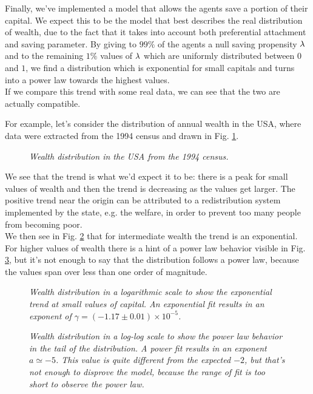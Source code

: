 Finally, we've implemented a model that allows the agents save a portion of their capital.
We expect this to be the model that best describes the real distribution of wealth, due to the fact that it takes into account both preferential attachment and saving parameter.
By giving to $99 \%$ of the agents a null saving propensity $\lambda$ and to the remaining $1 \%$ values of $\lambda$ which are uniformly distributed between $0$ and $1$, we find a distribution which is exponential for small capitals and turns into a power law towards the highest values. \\
If we compare this trend with some real data, we can see that the two are actually compatible.

For example, let's consider the distribution of annual wealth in the USA, where data were extracted from the 1994 census and drawn in Fig. \ref{fig:gloabl_realData}.
\begin{figure}[H]
    \centering
    \scalebox{.7}{}
    \caption{\emph{Wealth distribution in the USA from the 1994 census.}}
    \label{fig:gloabl_realData}
\end{figure}
We see that the trend is what we'd expect it to be: there is a peak for small values of wealth and then the trend is decreasing as the values get larger.
The positive trend near the origin can be attributed to a redistribution system implemented by the state, e.g. the welfare, in order to prevent too many people from becoming poor. \\
We then see in Fig. \ref{fig:real_head} that for intermediate wealth the trend is an exponential.
For higher values of wealth there is a hint of a power law behavior visible in Fig. \ref{fig:real_tail}, but it's not enough to say that the distribution follows a power law, because the values span over less than one order of magnitude.
\begin{figure}[H]
    \centering
    \scalebox{.7}{}
	 \caption{\emph{Wealth distribution in a logarithmic scale to show the exponential trend at small values of capital.
                     An exponential fit results in an exponent of $\gamma = (-1.17 \pm 0.01)\times 10^{-5}$.}}
    \label{fig:real_head}
\end{figure}
\begin{figure}[H]
    \centering
    \scalebox{.7}{}
    \caption{\emph{Wealth distribution in a log-log scale to show the power law behavior in the tail of the distribution.
                    A power fit results in an exponent $a \simeq -5$.
                    This value is quite different from the expected $-2$, but that's not enough to disprove the model, because the range of fit is too short to observe the power law.}}
    \label{fig:real_tail}
\end{figure}
